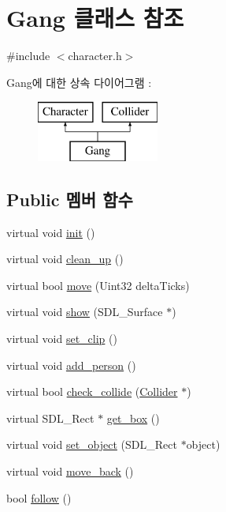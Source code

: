 \hypertarget{class_gang}{\section{\-Gang 클래스 참조}
\label{class_gang}
}


{\ttfamily \#include $<$character.\-h$>$}

\-Gang에 대한 상속 다이어그램 \-: \begin{figure}[H]
\begin{center}
\leavevmode
\includegraphics[height=2.000000cm]{class_gang}
\end{center}
\end{figure}
\subsection*{\-Public 멤버 함수}
\begin{DoxyCompactItemize}
\item 
virtual void \hyperlink{class_gang_a3788b8ace6c57cdcdc464a2f96169484}{init} ()
\item 
virtual void \hyperlink{class_gang_af472124b9a8c3e4a5950562342ec8162}{clean\-\_\-up} ()
\item 
virtual bool \hyperlink{class_gang_abccb863ee9ef936fad5031a0d93e1b55}{move} (\-Uint32 delta\-Ticks)
\item 
virtual void \hyperlink{class_gang_a29330bf2df1bd60644513b2cb27f29e6}{show} (\-S\-D\-L\-\_\-\-Surface $\ast$)
\item 
virtual void \hyperlink{class_gang_af4463fb95507a172b1495fae411bfba5}{set\-\_\-clip} ()
\item 
virtual void \hyperlink{class_gang_ad177257ab75d22c409b6b7b89c5d0870}{add\-\_\-person} ()
\item 
virtual bool \hyperlink{class_gang_ae97a9f4995e999fde4265663e3a838f7}{check\-\_\-collide} (\hyperlink{class_collider}{\-Collider} $\ast$)
\item 
virtual \-S\-D\-L\-\_\-\-Rect $\ast$ \hyperlink{class_gang_aebd4bd585e284c70b97782ac9af904ee}{get\-\_\-box} ()
\item 
virtual void \hyperlink{class_gang_a74c369149d11573fbad437d997266c36}{set\-\_\-object} (\-S\-D\-L\-\_\-\-Rect $\ast$object)
\item 
virtual void \hyperlink{class_gang_ac3aa2c0e70ecf1e7ce42192f684d1398}{move\-\_\-back} ()
\item 
bool \hyperlink{class_gang_a9984bed5cfe0541a97e00e2972666bae}{follow} ()
\end{DoxyCompactItemize}


